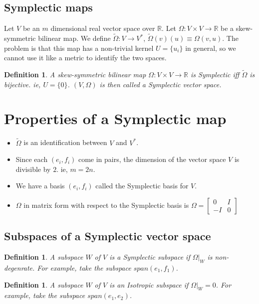 \documentclass[11pt]{book}
\newcommand{\R}{\ensuremath{\mathbb R}}
\newtheorem{definition}[theorem]{Definition}
\begin{document}
\subsection{Symplectic maps}

Let $V$ be an $m$ dimensional real vector space over \R. Let $\Omega: V \times V \rightarrow \mathbb{R}$
be a skew-symmetric bilinear map. We define 
$\tilde \Omega: V \rightarrow V^*$, $\tilde \Omega(v)(u) \equiv \Omega(v, u)$. 
The problem is that this map has a non-trivial kernel $U = \{ u_i \}$ in general,
so we cannot use it like a metric to identify the two spaces.

\begin{definition} A skew-symmetric bilinear map $\Omega: V \times V \rightarrow \R$ is Symplectic iff
    $\tilde \Omega$ is bijective. ie, $U = \{ 0\}$. $(V, \Omega)$ is then
    called a Symplectic vector space.
\end{definition}

\section{Properties of a Symplectic map}
\begin{itemize}
    \item $\tilde \Omega$ is an identification between $V$ and $V^*$.
    \item Since each $(e_i, f_i)$ come in pairs, the dimension of the vector space $V$ is divisible by $2$. ie, $m = 2n$.
    \item We have a basis $(e_i, f_i)$ called the Symplectic basis for $V$.
    \item $\Omega$ in matrix form with respect to the Symplectic basis is $\Omega = \begin{bmatrix} 0 & I \\ -I & 0 \end{bmatrix}$
\end{itemize}

\subsection{Subspaces of a Symplectic vector space}

\begin{definition}
    A subspace $W$ of $V$ is a Symplectic subspace if $\Omega|_W$ is non-degenrate.
    For example, take the subspace $span(e_1, f_1)$.
\end{definition}


\begin{definition}
    A subspace $W$ of $V$ is an Isotropic subspace if $\Omega|_W = 0$.
    For example, take the subspace $span(e_1, e_2)$.
\end{definition}
\end{document}
